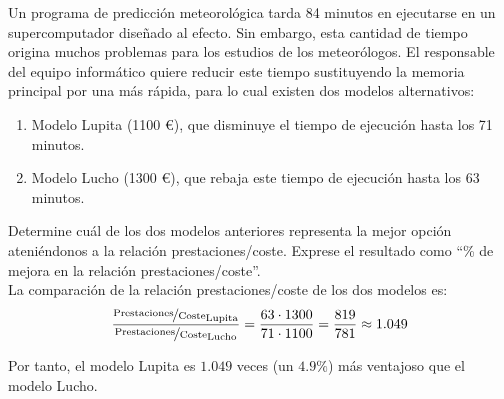 \begin{comment}
SOLUCIÓN: La opción más ventajosa teniendo en cuenta la relación entre las prestaciones y el coste es ampliar la memoria principal.
\end{comment}

\begin{ejercicio}
Un programa de predicción meteorológica tarda 84 minutos en ejecutarse en un supercomputador diseñado al efecto. Sin embargo, esta cantidad de tiempo origina muchos problemas para los estudios de los meteorólogos. El responsable del equipo informático quiere reducir este tiempo sustituyendo la memoria principal por una más rápida, para lo cual existen dos modelos alternativos:
\begin{enumerate}
    \item Modelo Lupita (1100 \euro), que disminuye el tiempo de ejecución hasta los 71 minutos.
    \item Modelo Lucho (1300 \euro), que rebaja este tiempo de ejecución hasta los 63 minutos.
\end{enumerate}
Determine cuál de los dos modelos anteriores representa la mejor opción ateniéndonos a la relación prestaciones/coste. Exprese el resultado como ``\% de mejora en la relación prestaciones/coste''.\\

La comparación de la relación prestaciones/coste de los dos modelos es:
\begin{equation*}
    \frac{\nicefrac{\text{Prestaciones}}{\text{Coste}}_{\text{Lupita}}}{\nicefrac{\text{Prestaciones}}{\text{Coste}}_{\text{Lucho}}} = \dfrac{63\cdot 1300}{71\cdot 1100} = \dfrac{819}{781} \approx 1.049
\end{equation*}

Por tanto, el modelo Lupita es $1.049$ veces (un $4.9\%$) más ventajoso que el modelo Lucho.
\end{ejercicio}
\begin{comment}
SOLUCIÓN: La primera de las opciones presenta una relación prestaciones/coste un 4,9\% mejor que la segunda.
\end{comment}

